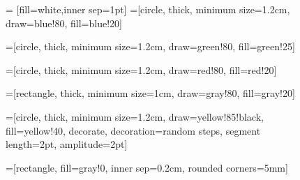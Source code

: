\documentclass[a4paper,10pt]{article}
\begin{document}
\begin{figure}[htbp]
\centering
 = [fill=white,inner sep=1pt]
=[circle,
                                    thick,
                                    minimum size=1.2cm,
                                    draw=blue!80,
                                    fill=blue!20]

=[circle,
                                                thick,
                                                minimum size=1.2cm,
                                                draw=green!80,
                                                fill=green!25]

=[circle,
                                    thick,
                                    minimum size=1.2cm,
                                    draw=red!80,
                                    fill=red!20]

=[rectangle,
                                    thick,
                                    minimum size=1cm,
                                    draw=gray!80,
                                    fill=gray!20]

=[circle,
                                    thick,
                                    minimum size=1.2cm,
                                    draw=yellow!85!black,
                                    fill=yellow!40,
                                    decorate,
                                    decoration={random steps,
                                                            segment length=2pt,
                                                            amplitude=2pt}]

=[rectangle,
                                     fill=gray!0,
                                     inner sep=0.2cm,
                                     rounded corners=5mm]


\end{figure}
\end{document}
